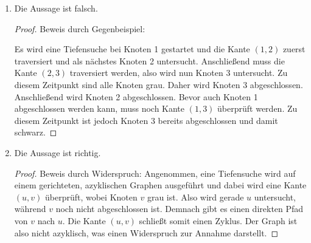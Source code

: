 \documentclass[11pt,a4paper]{article}
\begin{document}
\begin{loesung}
    \begin{enumerate}
        \item Die Aussage ist falsch.
        \begin{proof}
            Beweis durch Gegenbeispiel:
            \begin{figure}[h!]
                \centering
            \end{figure}
            \FloatBarrier
            Es wird eine Tiefensuche bei Knoten 1 gestartet und die Kante $(1, 2)$ zuerst traversiert und als nächstes Knoten 2 untersucht.
            Anschließend muss die Kante $(2, 3)$ traversiert werden, also wird nun Knoten 3 untersucht.
            Zu diesem Zeitpunkt sind alle Knoten grau.
            Daher wird Knoten 3 abgeschlossen.
            Anschließend wird Knoten 2 abgeschlossen.
            Bevor auch Knoten 1 abgeschlossen werden kann, muss noch Kante $(1, 3)$ überprüft werden.
            Zu diesem Zeitpunkt ist jedoch Knoten 3 bereits abgeschlossen und damit schwarz.
        \end{proof}
        \item Die Aussage ist richtig.
        \begin{proof}
            Beweis durch Widerspruch:
            Angenommen, eine Tiefensuche wird auf einem gerichteten, azyklischen Graphen ausgeführt und dabei wird eine Kante $(u, v)$ überprüft, wobei Knoten $v$ grau ist.
            Also wird gerade $u$ untersucht, während $v$ noch nicht abgeschlossen ist.
            Demnach gibt es einen direkten Pfad von $v$ nach $u$.
            Die Kante $(u, v)$ schließt somit einen Zyklus.
            Der Graph ist also nicht azyklisch, was einen Widerspruch zur Annahme darstellt.
        \end{proof}
    \end{enumerate}
\end{loesung}
\end{document}
